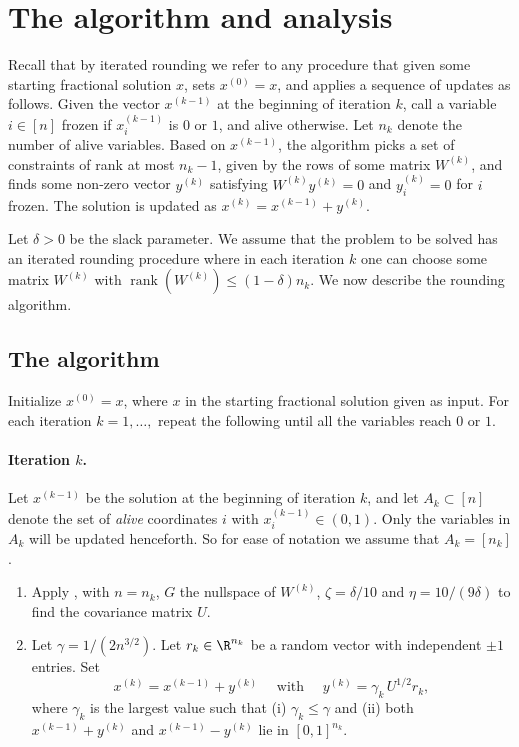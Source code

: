 \documentclass{toc}
\newcommand{\rank}{\operatorname{rank}}
\begin{document}
\section{The algorithm and analysis}
Recall that by iterated rounding we refer to any procedure that
given some starting fractional solution $x$, sets $x^{(0)}=x$, and 
applies a sequence of updates as follows.
Given the vector $x^{(k-1)}$ at the beginning of iteration $k$, call a variable $i \in [n]$
frozen if $x_i^{(k-1)}$ is $0$ or $1$, and alive otherwise. 
%
Let $n_k$ denote the number of alive variables.
Based on $x^{(k-1)}$, the algorithm picks a set of constraints of rank at most $n_k-1$,
given by the rows of some matrix $W^{(k)}$, and finds some non-zero vector $y^{(k)}$ satisfying $W^{(k)} y^{(k)} =0$ and $y^{(k)}_i=0$ for $i$ frozen.
The solution is updated as $x^{(k)} = x^{(k-1)} + y^{(k)}$.

%
%
%
%
%
%
%




Let $\delta>0$ be the slack parameter.
We assume that the problem to be solved has an iterated rounding procedure where in each iteration $k$ one can choose some matrix $W^{(k)}$ with $\rank(W^{(k)}) \leq (1-\delta) n_k$.
%
We now describe the rounding algorithm.
\subsection{The algorithm}
Initialize $x^{(0)}=x$, where $x$ in the starting fractional solution given as input.
For each iteration $k=1,\ldots,$ repeat the following until all the  variables reach $0$ or $1$.
\paragraph{Iteration $k$.} Let $x^{(k-1)}$ be the solution at the beginning of iteration $k$, and let $A_k \subset [n]$ denote the set of \emph{alive} coordinates $i$ with $x^{(k-1)}_i \in (0,1)$. 
Only the variables in $A_k$ will be updated henceforth. 
So for ease of notation we assume that $A_k = [n_k]$.
\begin{enumerate}
\item
Apply , with $n=n_k$, $G$ the nullspace of $W^{(k)}$, $\zeta=\delta/10$ and $\eta= 10/(9\delta)$ to find the covariance matrix $U$.
\item  Let $\gamma = 1/(2n^{3/2})$. Let $r_k \in \R^{n_k}$ be a random vector with independent $\pm 1$ entries. Set
\[x^{(k)} = x^{(k-1)} +  y^{(k)}  \quad \text{ with } \quad y^{(k)} = \gamma_k \, U^{1/2} r_k,\] where
$\gamma_k$ is the largest value such that (i) $\gamma_k \leq \gamma $ and (ii) both
 $x^{(k-1)} + y^{(k)}$ and $x^{(k-1)} - y^{(k)}$ lie in  $[0,1]^{n_k}$.
\end{enumerate}
\end{document}
